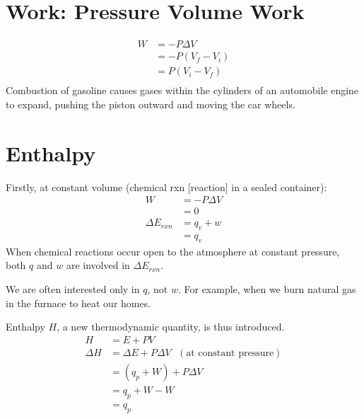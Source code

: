 \documentclass[
	chapter=6,
	title={Thermochemistry},
	showanswers=true,
]{chem122notes}
\begin{document}
\section{Work: Pressure Volume Work}\label{sec:work:-pressure-volume-work}
\begin{equation}
	\begin{aligned}
		W &= -P\Delta V\\
		  &= -P(V_{f} - V_{i})\\
		  &= P(V_{i} - V_{f})\\
	\end{aligned}
	\label{eq:pressue-volume-work}
\end{equation}
Combustion of gasoline causes gases within the cylinders of an automobile engine to expand, pushing the piston outward and moving the car wheels.

\section{Enthalpy}\label{sec:enthalpy}

Firstly, at constant volume (chemical rxn [reaction] in a sealed container):
\begin{equation*}
\begin{aligned}
	W &= -P\Delta V\\
	  &= 0\\
	\Delta E_{rxn} &= q_{v} + w\\
						 &= q_{v}
\end{aligned}
\end{equation*}
When chemical reactions occur open to the atmosphere at constant pressure, both $q$ and $w$ are involved in $\Delta E_{rxn}$.

We are often interested only in $q$, not $w$.
For example, when we burn natural gas in the furnace to heat our homes.

Enthalpy $H$, a new thermodynamic quantity, is thus introduced.
\begin{equation}
	\begin{aligned}
		H &= E + PV\\
		\Delta H &= \Delta E + P\Delta V \ \ \ (\mbox{at constant pressure})\\
		&= (q_{p} + W) + P\Delta V\\
		&= q_{p} + W - W\\
		&= q_{p}
	\end{aligned}
	\label{eq:enthalpy}
\end{equation}
\end{document}
